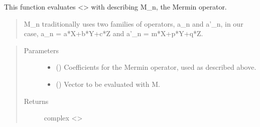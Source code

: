 \documentclass[letterpaper,10pt,english]{sphinxmanual}
\begin{document}
\begin{fulllineitems}
\label{\detokenize{mermin_eval:mermin_eval.M_eval}}
This function evaluates \textless{}\textgreater{} with  describing 
M\_n, the Mermin operator.
\begin{quote}

M\_n traditionally uses two families of operators, a\_n and a’\_n, in our 
case, a\_n = a*X+b*Y+c*Z and a’\_n = m*X+p*Y+q*Z.
\end{quote}
\begin{quote}\begin{description}
\item[{Parameters}] \leavevmode\begin{itemize}
\item {} 
\sphinxstyleliteralstrong{\sphinxupquote{,}}\sphinxstyleliteralstrong{\sphinxupquote{,}}\sphinxstyleliteralstrong{\sphinxupquote{,}}\sphinxstyleliteralstrong{\sphinxupquote{,}}\sphinxstyleliteralstrong{\sphinxupquote{,}} () \textendash{} Coefficients for the Mermin operator, used as 
described above.

\item {} 
 (\sphinxstyleliteralemphasis{\sphinxupquote{{[}}}\sphinxstyleliteralemphasis{\sphinxupquote{{]}}}) \textendash{} Vector to be evaluated with M.

\end{itemize}

\item[{Returns}] \leavevmode
complex \textendash{} \textless{}\textgreater{}

\end{description}\end{quote}

\end{fulllineitems}
\end{document}
